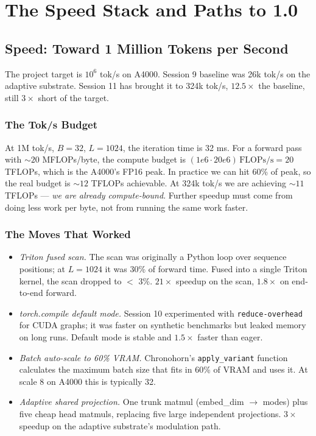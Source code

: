 \documentclass[11pt,openany]{book}
\theoremstyle{definition}
\theoremstyle{plain}
\begin{document}
\part{The Speed Stack and Paths to 1.0}

\chapter{Speed: Toward 1 Million Tokens per Second}
\label{ch:speed}

The project target is $10^6$ tok/s on A4000. Session 9 baseline was
26k tok/s on the adaptive substrate. Session 11 has brought it to 324k
tok/s, $12.5\times$ the baseline, still $3\times$ short of the target.

\section{The Tok/s Budget}

At 1M tok/s, $B = 32$, $L = 1024$, the iteration time is 32 ms. For a
forward pass with $\sim 20$ MFLOPs/byte, the compute budget is
$(1e6 \cdot 20e6)\,\text{FLOPs/s} = 20$ TFLOPs, which is the A4000's
FP16 peak. In practice we can hit 60\% of peak, so the real budget is
$\sim 12$ TFLOPs achievable. At 324k tok/s we are achieving $\sim 11$
TFLOPs --- \emph{we are already compute-bound}. Further speedup must
come from doing less work per byte, not from running the same work
faster.

\section{The Moves That Worked}

\begin{itemize}
  \item \emph{Triton fused scan.} The scan was originally a Python loop
    over sequence positions; at $L = 1024$ it was 30\% of forward time.
    Fused into a single Triton kernel, the scan dropped to $<$ 3\%.
    $21\times$ speedup on the scan, $1.8\times$ on end-to-end forward.
  \item \emph{torch.compile default mode.} Session 10 experimented with
    \texttt{reduce-overhead} for CUDA graphs; it was faster on
    synthetic benchmarks but leaked memory on long runs. Default mode
    is stable and $1.5\times$ faster than eager.
  \item \emph{Batch auto-scale to 60\% VRAM.} Chronohorn's
    \texttt{apply\_variant} function calculates the maximum batch
    size that fits in 60\% of VRAM and uses it. At scale 8 on A4000
    this is typically 32.
  \item \emph{Adaptive shared projection.} One trunk matmul
    (embed\_dim $\to$ modes) plus five cheap head matmuls, replacing
    five large independent projections. $3\times$ speedup on the
    adaptive substrate's modulation path.
\end{itemize}
\end{document}
